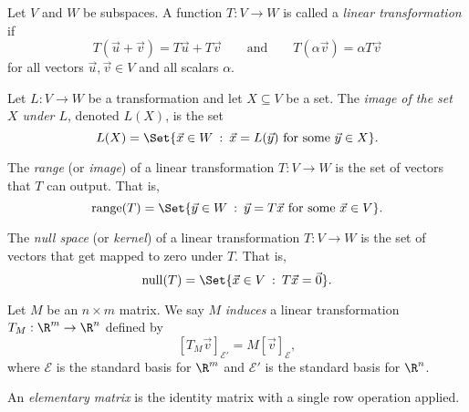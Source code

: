 \begin{SaveDefinition}[key=LinearTransformation, title={Linear Transformation}]
	Let $V$ and $W$ be subspaces. A function $T:V\to W$ is called a
	\emph{linear transformation} if
	\[
		T(\vec u+\vec v)=T\vec u+T\vec v \qquad\text{and}\qquad T(\alpha
		\vec v)=\alpha T\vec v
	\]
	 for all vectors $\vec u,\vec v\in V$ and all scalars $\alpha$.
\end{SaveDefinition}

\begin{SaveDefinition}[key=ImageofaSet, title={Image of a Set}]
	Let $L:V\to W$ be a transformation and let $X\subseteq V$ be a set. The
	\emph{image of the set $X$ under $L$}, denoted $L(X)$, is the set
	\[
		L(X)=\Set{\vec x\in W \given \vec x=L(\vec y)\text{ for some }\vec
		y\in X}.
	\]

\end{SaveDefinition}

\begin{SaveDefinition}[key=Range, title={Range}]
	The
	\emph{range} (or
	\emph{image}) of a linear transformation $T:V\to W$ is the set of vectors
	that $T$ can output. That is,
	\[
		\Range(T)=\Set{\vec y\in W \given \vec y=T\vec x\text{ for some }\vec
		x\in V}.
	\]

\end{SaveDefinition}

\begin{SaveDefinition}[key=NullSpace, title={Null Space}]
	The
	\emph{null space} (or
	\emph{kernel}) of a linear transformation $T:V\to W$ is the set of vectors
	that get mapped to zero under $T$. That is,
	\[
		\Null(T)=\Set{\vec x\in V \given T\vec x=\vec 0}.
	\]

\end{SaveDefinition}

\begin{SaveDefinition}[
	key=InducedTransformation,
	title={Induced Transformation}]

	Let $M$ be an $n\times m$ matrix. We say $M$
	\emph{induces} a linear transformation $T_{M}:\R^{m}\to\R^{n}$ defined
	by
	\[
		[T_{M}\vec v]_{\mathcal E'}= M[\vec v]_{\mathcal E},
	\]
	 where $\mathcal E$ is the standard basis for $\R^{m}$ and $\mathcal E'$
	is the standard basis for $\R^{n}$.
\end{SaveDefinition}

\begin{SaveDefinition}[
	key=ElementaryMatrix,
	title={ElementaryMatrix}]

	An \emph{elementary matrix} is the identity matrix with a single row operation applied.
\end{SaveDefinition}

